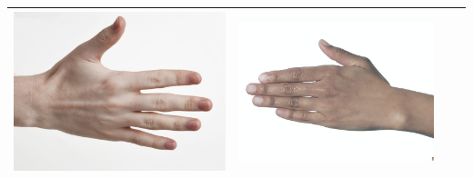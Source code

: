 \documentclass[12pt, a4paper]{article}
\begin{document}
\begin{longtable}{|c||c|c|c|}
\begin{minipage}{.29\textwidth}
    \includegraphics[width=\textwidth,height=\textheight,keepaspectratio]{../inputs/hand_pale.jpg}
  \end{minipage} & 
  \begin{minipage}{.29\textwidth}
    \includegraphics[width=\textwidth,height=\textheight,keepaspectratio]{../rc_test/outputs/20170516_boost_test/hand_brown_to_hand_pale.jpg}
  \end{minipage} \\
    \hline
\end{longtable}
\end{document}
